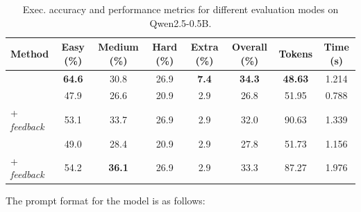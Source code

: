 \begin{table}[t]
    \scriptsize
    \centering
    \caption{Exec. accuracy and performance metrics for different evaluation modes on \mbox{Qwen2.5-0.5B.}}
    \begin{tabular}{lccccccc}
        \toprule
        \textbf{Method} & \textbf{Easy (\%)} & \textbf{Medium (\%)} & \textbf{Hard (\%)} & \textbf{Extra (\%)} & \textbf{Overall (\%)} & \textbf{Tokens} & \textbf{Time (s)} \\
        \midrule
        \Tool{} & \textbf{64.6} & 30.8 & 26.9 & \textbf{7.4} & \textbf{34.3} & \textbf{48.63} & 1.214 \\
        
        \standard{} & 47.9 & 26.6 & 20.9 & 2.9 & 26.8 & 51.95 & 0.788 \\
        \standard{} + \textit{feedback} & 53.1 & 33.7 & 26.9 & 2.9 & 32.0 & 90.63 & 1.339 \\

        \syncode{} & 49.0 & 28.4 & 20.9 & 2.9 & 27.8 & 51.73 & 1.156 \\
        
        \syncode{} + \textit{feedback} & 54.2 & \textbf{36.1} & 26.9 & 2.9 & 33.3 & 87.27 & 1.976 \\
        
        
        \bottomrule
    \end{tabular}
    \label{tab:reprompt}
\end{table}

The prompt format for the model is as follows:


